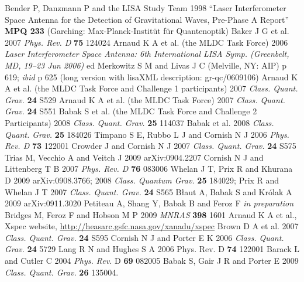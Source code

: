 \documentclass{iopart}
\begin{document}
\begin{thebibliography}{99}
%
 Bender P, Danzmann P and the LISA Study Team 1998 ``Laser Interferometer Space Antenna for the Detection of Gravitational Waves, Pre-Phase A Report'' \textbf{MPQ 233} (Garching: Max-Planck-Instit\"ut f\"ur Quantenoptik) 
%
 Baker J G et al. 2007 \textit{Phys. Rev. D} \textbf{75} 124024
%
 Arnaud K A et al. (the MLDC Task Force) 2006 \textit{Laser Interferometer Space Antenna: 6th International LISA Symp. (Greenbelt, MD, 19--23 Jun 2006)} ed Merkowitz S M and Livas J C (Melville, NY: AIP) p 619; \textit{ibid} p 625 (long version with lisaXML description: gr-qc/0609106)
%
 Arnaud K A et al. (the MLDC Task Force and Challenge 1 participants) 2007 \textit{Class. Quant. Grav.} \textbf{24} S529
%
 Arnaud K A et al. (the MLDC Task Force) 2007 \textit{Class. Quant. Grav.} \textbf{24} S551
%
 Babak S et al. (the MLDC Task Force and Challenge 2 Participants) 2008 \textit{Class. Quant. Grav.} \textbf{25} 114037
%
 Babak et al. 2008 \textit{Class. Quant. Grav.} \textbf{25} 184026
%
 Timpano S E, Rubbo L J and Cornish N J 2006 \textit{Phys. Rev. D} \textbf{73} 122001
%
 Crowder J and Cornish N J 2007 \textit{Class. Quant. Grav.}  \textbf{24} S575
%
 Trias M, Vecchio A and Veitch J 2009 arXiv:0904.2207 
%
 Cornish N J and Littenberg T B 2007 \textit{Phys. Rev. D} \textbf{76} 083006
%
 Whelan J T, Prix R and Khurana D 2009 arXiv:0908.3766;
2008 \textit{Class. Quantum Grav.} \textbf{25} 184029;
Prix R and Whelan J T 2007 \textit{Class. Quant. Grav.} \textbf{24} S565 
%
 B{\l}aut A, Babak S and Kr{\'o}lak A 2009 arXiv:0911.3020
%
 Petiteau A, Shang Y, Babak B and Feroz F \textit{in preparation}
%
 Bridges M, Feroz F and Hobson M P 2009 \textit{MNRAS} \textbf{398} 1601
%
 Arnaud K A et al., Xspec website, \url{http://heasarc.gsfc.nasa.gov/xanadu/xspec}
%
 Brown D A et al. 2007 \textit{Class. Quant. Grav.} \textbf{24} S595  
%
 Cornish N J and Porter E K 2006 \textit{Class. Quant. Grav.} \textbf{24} 5729
%
 Lang R N and Hughes S A 2006 Phys. Rev. D \textbf{74} 122001
%
 Barack L and Cutler C 2004 \textit{Phys. Rev.} D \textbf{69} 082005
%
 Babak S, Gair J R and Porter E 2009 \textit{Class. Quant. Grav.} \textbf{26} 135004.

\end{thebibliography}
\end{document}
